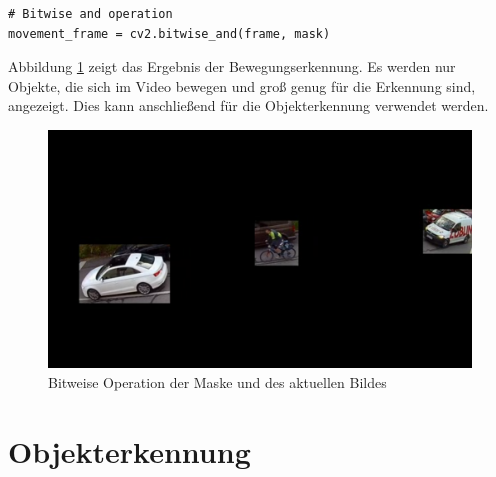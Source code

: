 \vspace*{1mm}
\begin{lstlisting}[caption={UND-Operation der Maske und des aktuellen Bildes}, label={lst:bitwise_operation}]
# Bitwise and operation
movement_frame = cv2.bitwise_and(frame, mask)
\end{lstlisting}

Abbildung \ref{fig:bitwiseoperation} zeigt das Ergebnis der Bewegungserkennung. Es werden nur Objekte, die sich im Video bewegen und groß genug für die Erkennung sind, angezeigt. Dies kann anschließend für die Objekterkennung verwendet werden. 

\begin{figure}[htb]
	\centering
	\includegraphics[width=.9\textwidth]{images/abbildung_movement}
	\caption{Bitweise Operation der Maske und des aktuellen Bildes}
	\label{fig:bitwiseoperation}
\end{figure}

\section{Objekterkennung}\label{ch:objekterkennung}

